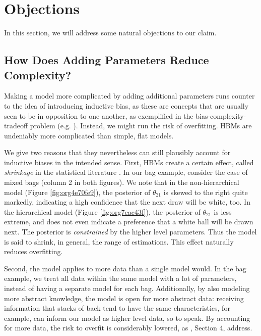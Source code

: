 \documentclass[11pt, a4paper]{article}
\begin{document}
\section{Objections}

In this section, we will address some natural objections to our claim. 
\label{sec:org87d755f}
\subsection{How Does Adding Parameters Reduce Complexity?}
\label{sec:orga21625a}

Making a model more complicated by adding additional parameters runs counter to
the idea of introducing inductive bias, as these are concepts that are usually
seen to be in opposition to one another, as exemplified in the
bias-complexity-tradeoff problem (e.g.
\cite{shalev-shwartz14_under_machin_learn,harman07_reliab_reason}). Instead, we
might run the risk of overfitting. HBMs are undeniably more complicated than
simple, flat models.

We give two reasons that they nevertheless can still plausibly account for
inductive biases in the intended sense. First, HBMs create a certain effect,
called \emph{shrinkage} in the statistical literature
\citep{kruschke11_doing_bayes}. In our bag example, consider the case of
mixed bags (column 2 in both figures). We note that in the non-hierarchical model (Figure
\ref{fig:org4e70fe9}), the posterior of \(\theta_{21}\) is skewed to the right
quite markedly, indicating a high confidence that the next draw will be white,
too. In the hierarchical model (Figure \ref{fig:org7eac43f}), the posterior of
\(\theta_{21}\) is less extreme, and does not even indicate a preference that a
white ball will be drawn next. The posterior is \textit{constrained} by the
higher level parameters. Thus the model is said to shrink, in general, the range
of estimations. This effect naturally reduces overfitting.

Second, the model applies to more data than a single model would. In the bag
example, we treat all data within the same model with a lot of parameters,
instead of having a separate model for each bag. Additionally, by also modeling
more abstract knowledge, the model is open for more abstract data: receiving
information that stacks of back tend to have the same characteristics, for
example, can inform our model as higher level data, so to speak. By accounting
for more data, the risk to overfit is considerably lowered, as
\cite{perfors11_tutor_introd_to_bayes_model_cognit_devel}, Section 4, address.
\end{document}
